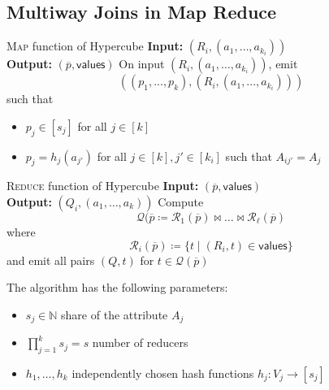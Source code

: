 \documentclass[english]{panikzettel}
\begin{document}
\subsection{Multiway Joins in Map Reduce}
\begin{halfboxl}
\vspace{-\baselineskip}
\begin{algo}{\textsc{Map} function of Hypercube}
\textbf{Input:} $(R_i, (a_1, \ldots, a_{k_i}))$ \\
\textbf{Output:} $(\overline{p}, \textsf{values})$
\tcblower
On input $(R_i, (a_1, \ldots, a_{k_i}))$, emit
\[
((p_1,...,p_k),(R_i,(a_1,...,a_{k_i})))
\]
such that
\begin{itemize}
	\item $p_j\in [s_j]$ for all $j\in [k]$
	\item $p_j=h_j(a_{j'})$ for all $j\in [k],j'\in [k_i]$ such that $A_{ij'}=A_j$
\end{itemize}
\end{algo}
\end{halfboxl}%
\begin{halfboxr}
\vspace{-\baselineskip}
\begin{algo}{\textsc{Reduce} function of Hypercube}
\textbf{Input:} $(\overline{p}, \textsf{values})$ \\
\textbf{Output:} $(Q_i, (a_1, \ldots, a_k))$
\tcblower
Compute
\[
\mathcal{Q}(\overline{p}\coloneqq \mathcal{R}_1(\overline{p})\bowtie \ldots \bowtie \mathcal{R}_\ell (\overline{p})
\]
where
\[
\mathcal{R}_i(\overline{p})\coloneqq \{t\mid (R_i, t)\in \textsf{values} \}
\]
and emit all pairs $(Q,t)$ for $t\in \mathcal{Q}(\overline{p})$
\end{algo}
\end{halfboxr}

The algorithm has the following parameters:

\begin{itemize}
	\item $s_j \in \mathbb{N}$ share of the attribute $A_j$
	\item $\prod_{j=1}^k s_j = s$ number of reducers
	\item $h_1, \ldots, h_k$ independently chosen hash functions $h_j : V_j \rightarrow [s_j]$
\end{itemize}
\end{document}
